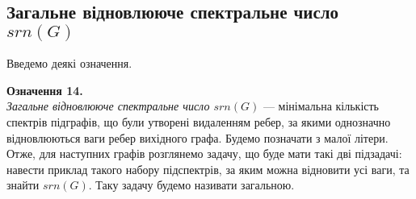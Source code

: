 \subsection{Загальне відновлююче спектральне число $srn(G)$}
Введемо деякі означення.

 \textbf{Означення 14.}\\
 \textit{Загальне відновлююче спектральне число $srn(G)$} --- мінімальна кількість спектрів підграфів, що були утворені видаленням ребер, за якими однозначно відновлюються ваги ребер вихідного графа. Будемо позначати з малої літери.\\
 
 Отже, для наступних графів розглянемо задачу, що буде мати такі дві підзадачі: навести приклад такого набору підспектрів, за яким можна відновити усі ваги, та знайти $srn({G})$. Таку задачу будемо називати загальною.
